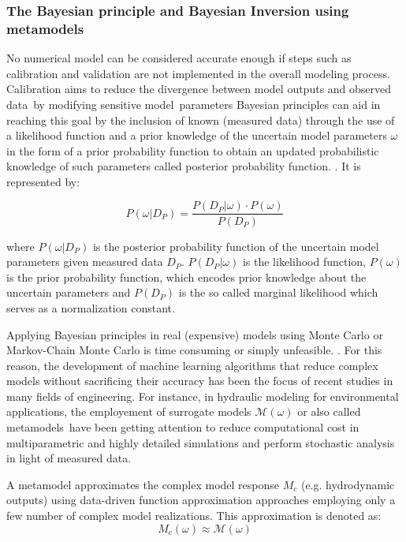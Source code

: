 \documentclass[draft,linenumbers,onecolumn]{agujournal2019} %
\begin{document}
\subsubsection{The Bayesian principle and Bayesian Inversion using metamodels}

No numerical model can be considered accurate enough if steps such as calibration and validation are not implemented in the overall modeling process. Calibration aims to reduce the divergence between model outputs and observed data by modifying sensitive model parameters \cite{bibid} Bayesian principles can aid in reaching this goal by the inclusion of known (measured data) through the use of a likelihood function and a prior knowledge of the uncertain model parameters \(\omega\) in the form of a prior probability function to obtain an updated probabilistic knowledge of such parameters called posterior probability function. \cite{smith1992bayesian}. It is represented by: 

\[
P(\omega | D_P) = \frac{P(D_P | \omega) \cdot P(\omega)}{P(D_P)}
\]


where \( P(\omega | D_P) \) is the posterior probability function of the uncertain model parameters given measured data \(D_P\). \(P(D_P | \omega)\)  is the likelihood function,  \( P(\omega) \) is the prior probability function, which encodes prior knowledge about the uncertain parameters and \( P(D_P) \) is the so called marginal likelihood which serves as a normalization constant.  


Applying Bayesian principles in real (expensive) models using Monte Carlo or Markov-Chain Monte Carlo is time consuming or simply unfeasible. \cite{oladyshkin2020bayesian3}.
For this reason, the development of machine learning algorithms that reduce complex models without sacrificing their accuracy has been the focus of recent studies in many fields of engineering. For instance, in hydraulic modeling for environmental applications, the employement of surrogate models \( \mathcal{M}(\omega) \)  or also called metamodels have been getting attention to reduce computational cost in  multiparametric and highly detailed simulations and perform stochastic analysis in light of measured data.


A metamodel approximates the complex model response \( M_c \) (e.g. hydrodynamic outputs) using data-driven function approximation approaches \cite{razavi2012review} employing only a few number of complex model realizations. This approximation is denoted as:
\[
M_c(\omega) \approx \mathcal{M}(\omega) 
\]
\end{document}
